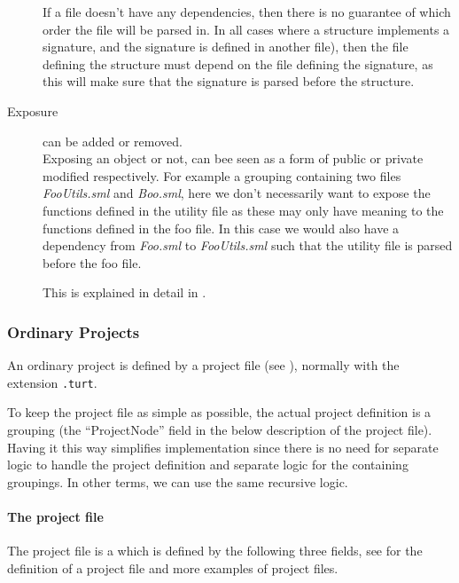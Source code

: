 \begin{description}
  If a file doesn't have any dependencies, then there is no guarantee of which
  order the file will be parsed in. In all cases where a structure implements a
  signature, and the signature is defined in another file), then the file
  defining the structure must depend on the file defining the signature, as this
  will make sure that the signature is parsed before the structure.

\item[Exposure] can be added or removed. \\

  Exposing an object or not, can bee seen as a form of public or private
  modified respectively. For example a grouping containing two files
  \textit{FooUtils.sml} and \textit{Boo.sml}, here we don't necessarily want to
  expose the functions defined in the utility file as these may only have
  meaning to the functions defined in the foo file. In this case we would also
  have a dependency from \textit{Foo.sml} to \textit{FooUtils.sml} such that the
  utility file is parsed before the foo file.

  This is explained in detail in .

\end{description}


\subsubsection{Ordinary Projects}


An ordinary project is defined by a project file (see
), normally with the extension \texttt{.turt}.

To keep the project file as simple as possible, the actual project definition is
a grouping (the ``ProjectNode'' field in the below description of the project
file). Having it this way simplifies implementation since there is no need for
separate logic to handle the project definition and separate logic for the
containing groupings. In other terms, we can use the same recursive logic.

\paragraph{The project file}

The project file is a  which is defined by the
following three fields, see  for the
definition of a project file and more examples of project files.
  


